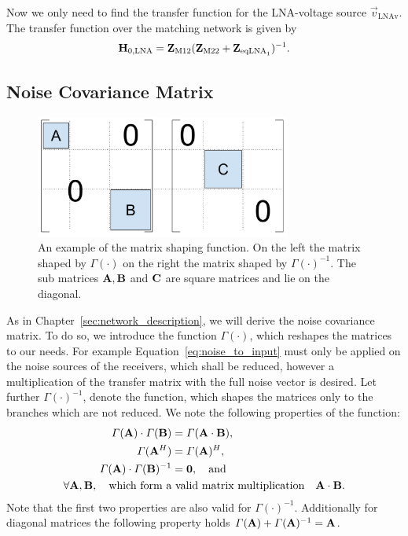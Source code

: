 Now we only need to find the transfer function for the LNA-voltage source $\vec{v}_\text{LNAv}$.
The transfer function over the matching network is given by
\begin{align}
\label{eq:noise_to_input}
\mathbf{H}_\text{0,LNA} = \mathbf{Z}_\text{M12}(\mathbf{Z}_\text{M22}+\mathbf{Z}_{\text{eqLNA}_1})^{-1}.
\end{align}




\subsection{Noise Covariance Matrix}
\label{sec:sig_cov}

\begin{figure}[h]
\begin{center}
\includegraphics[width=0.75\textwidth]{images/matrix_shaping.png}
\caption{An example of the matrix shaping function. On the left the matrix shaped by $\Gamma(\cdot)$ on the right the matrix shaped by $\Gamma(\cdot)^{-1}$. The sub matrices $\mathbf{A},\mathbf{B}$ and $\mathbf{C}$ are square matrices and lie on the diagonal.}
\label{fig:matrix_shaping}
\end{center}
\end{figure}

As in Chapter~\ref{sec:network_description}, we will derive the noise covariance matrix.
To do so, we introduce the function $\Gamma(\cdot)$, which reshapes the matrices to our needs.
For example Equation~\eqref{eq:noise_to_input} must only be applied on the noise sources of the receivers, which shall be reduced, however a multiplication of the transfer matrix with the full noise vector is desired.
Let further $\Gamma(\cdot)^{-1}$, denote the function, which shapes the matrices only to the branches which are not reduced.
We note the following properties of the function:
\begin{align}
\label{eq:gamma_properties}\nonumber
\Gamma(\mathbf{A})\cdot\Gamma(\mathbf{B}) &= \Gamma(\mathbf{A}\cdot\mathbf{B}),\\\nonumber
\Gamma(\mathbf{A}^{H}) &= \Gamma(\mathbf{A})^{H},\\\nonumber
\Gamma(\mathbf{A})\cdot\Gamma(\mathbf{B})^{-1} &= \mathbf{0},\quad\text{and}\\
\forall \mathbf{A},\mathbf{B},\quad\text{which form a}&\text{ valid matrix multiplication}\quad\mathbf{A}\cdot\mathbf{B}.
\end{align}
Note that the first two properties are also valid for $\Gamma(\cdot)^{-1}$.
Additionally for diagonal matrices the following property holds $\Gamma(\mathbf{A})+\Gamma(\mathbf{A})^{-1} = \mathbf{A}$.

